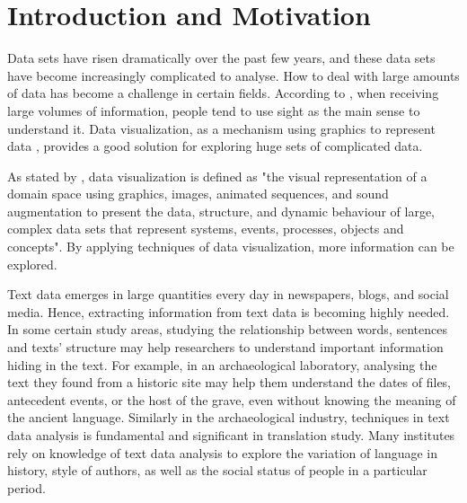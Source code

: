 
\section{Introduction and Motivation}

Data sets have risen dramatically over the past few years, and these data sets have become increasingly complicated to analyse. How to deal with large amounts of data has become a challenge in certain fields\cite{Larameea}. According to \cite{Ward2015}, when receiving large volumes of information, people tend to use sight as the main sense to understand it. Data visualization, as a mechanism  using graphics to represent data \cite{Ward2015}, provides a good solution for exploring huge sets of complicated data.

As stated by \cite{Williams1995}, data visualization is defined as "the visual representation of a domain space using graphics, images, animated sequences, and sound augmentation to present the data, structure, and dynamic behaviour of large, complex data sets that represent systems, events, processes, objects and concepts"\cite{Williams1995}. By applying techniques of data visualization, more information can be explored.

Text data emerges in large quantities every day in newspapers, blogs, and social media. Hence, extracting information from text data is becoming highly needed. In some certain study areas, studying the relationship between words, sentences and texts’ structure may help researchers to understand important information hiding in the text. For example, in an archaeological laboratory, analysing the text they found from a historic site may help them understand the dates of files, antecedent events, or the host of the grave, even without knowing the meaning of the ancient language. Similarly in the archaeological industry, techniques in text data analysis is fundamental and significant in translation study. Many institutes rely on knowledge of text data analysis to explore the variation of language in history, style of authors, as well as the social status of people in a particular period. 

